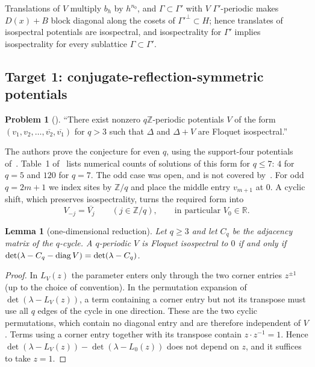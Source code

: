 \documentclass[11pt]{amsart}
\newtheorem{lemma}[theorem]{Lemma}
\theoremstyle{definition}
\newtheorem{problem}[theorem]{Problem}
\theoremstyle{remark}
\providecommand{\R}{\mathbb R}
\providecommand{\Z}{\mathbb Z}
\begin{document}
Translations of $V$ multiply $b_h$ by $h^{n_0}$, and $\Gamma\subset\Gamma'$ with
$V$ $\Gamma'$-periodic makes $D(x)+B$ block diagonal along the cosets of
$\Gamma'^{\perp}\subset H$; hence translates of isospectral potentials are
isospectral, and isospectrality for $\Gamma'$ implies isospectrality for every
sublattice $\Gamma\subset\Gamma'$.

\subsection{Target 1: conjugate-reflection-symmetric potentials}
\label{R3:ss:conj2}

\begin{problem}[{\cite[Section~4, Conjecture~2]{R3-FFORS}}]
\label{R3:prob:conj2}
``There exist nonzero $q\Z$-periodic potentials $V$ of the form
$(v_1,v_2,\ldots,\overline{v_2},\overline{v_1})$ for $q>3$ such that $\Delta$ and
$\Delta+V$ are Floquet isospectral.''
\end{problem}

The authors prove the conjecture for even $q$, using the support-four potentials
of~\cite{R3-FLMPRTTZ}. Table~1 of~\cite{R3-FFORS} lists numerical counts of
solutions of this form for $q\le7$: $4$ for $q=5$ and $120$ for $q=7$. The odd case was open, and is not covered
by~\cite{K-034}. For odd $q=2m+1$ we index sites by $\Z/q$ and place the
middle entry $v_{m+1}$ at $0$. A cyclic shift, which preserves isospectrality,
turns the required form into
\begin{equation}\label{R3:eq:tau}
 V_{-j}=\overline{V_j}\qquad(j\in\Z/q),\qquad\text{in particular }V_0\in\R .
\end{equation}

\begin{lemma}[one-dimensional reduction]\label{R3:lem:1d}
Let $q\ge3$ and let $C_q$ be the adjacency matrix of the $q$-cycle. A $q$-periodic
$V$ is Floquet isospectral to $0$ if and only if
$\det(\lambda-C_q-\operatorname{diag} V)=\det(\lambda-C_q)$.
\end{lemma}

\begin{proof}
In $L_V(z)$ the parameter enters only through the two corner entries $z^{\pm1}$
(up to the choice of convention). In the permutation expansion of
$\det(\lambda-L_V(z))$, a term containing a corner entry but not its transpose
must use all $q$ edges of the cycle in one direction. These are the two cyclic
permutations, which contain no diagonal entry and are therefore independent of
$V$. Terms using a corner entry together with its transpose contain
$z\cdot z^{-1}=1$. Hence $\det(\lambda-L_V(z))-\det(\lambda-L_0(z))$ does not
depend on $z$, and it suffices to take $z=1$.
\end{proof}
\end{document}
